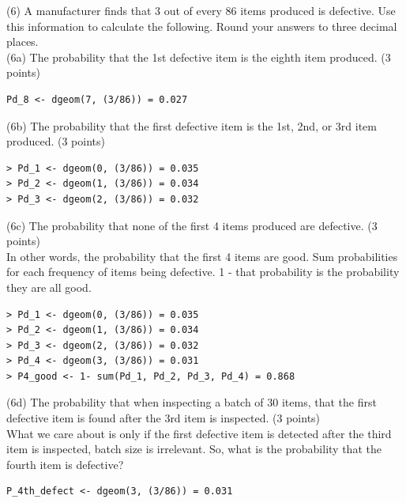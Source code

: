 \documentclass{article}
\begin{document}
(6) A manufacturer finds that 3 out of every 86 items produced is defective. Use this information to calculate the following. Round your answers to three decimal places.\\

(6a) The probability that the 1st defective item is the eighth item produced. (3 points)
\begin{center}
\begin{lstlisting}
Pd_8 <- dgeom(7, (3/86)) = 0.027
\end{lstlisting}
\end{center}

(6b) The probability that the first defective item is the 1st, 2nd, or 3rd item produced. (3 points)

\begin{center}
\begin{lstlisting}
> Pd_1 <- dgeom(0, (3/86)) = 0.035
> Pd_2 <- dgeom(1, (3/86)) = 0.034
> Pd_3 <- dgeom(2, (3/86)) = 0.032
\end{lstlisting}
\end{center}
(6c) The probability that none of the first 4 items produced are defective. (3 points)\\

In other words, the probability that the first 4 items are good. Sum probabilities for each frequency of items being defective. 1 - that probability is the probability they are all good.

\begin{center}
\begin{lstlisting}
> Pd_1 <- dgeom(0, (3/86)) = 0.035
> Pd_2 <- dgeom(1, (3/86)) = 0.034
> Pd_3 <- dgeom(2, (3/86)) = 0.032
> Pd_4 <- dgeom(3, (3/86)) = 0.031
> P4_good <- 1- sum(Pd_1, Pd_2, Pd_3, Pd_4) = 0.868

\end{lstlisting}
\end{center}


(6d) The probability that when inspecting a batch of 30 items, that the first defective item is found after the 3rd item is inspected. (3 points)\\

What we care about is only if the first defective item is detected after the third item is inspected, batch size is irrelevant. So, what is the probability that the fourth item is defective?

\begin{center}
\begin{lstlisting}
P_4th_defect <- dgeom(3, (3/86)) = 0.031
\end{lstlisting}
\end{center}
\end{document}

